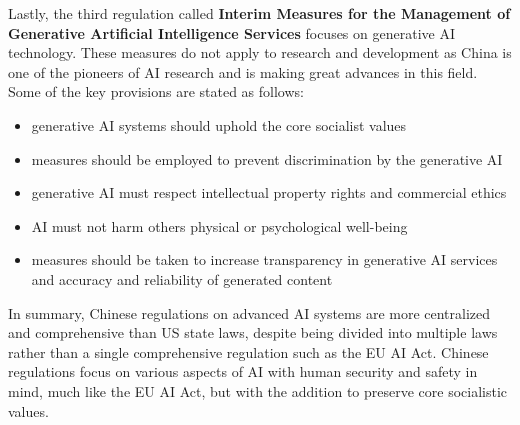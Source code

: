 Lastly, the third regulation called \textbf{Interim Measures for the Management of Generative Artificial Intelligence Services}\cite{InterimMeasuresGenerativeAI2023}\cite{CACGenerativeAIInterim2023} focuses on generative AI technology. These measures do not apply to research and development as China is one of the pioneers of AI research and is making great advances in this field. Some of the key provisions are stated as follows:
\begin{itemize}
    \item generative AI systems should uphold the core socialist values
    \item measures should be employed to prevent discrimination by the generative AI
    \item generative AI must respect intellectual property rights and commercial ethics
    \item AI must not harm others physical or psychological well-being
    \item measures should be taken to increase transparency in generative AI services and accuracy and reliability of generated content
\end{itemize}

In summary, Chinese regulations on advanced AI systems are more centralized and comprehensive than US state laws, despite being divided into multiple laws rather than a single comprehensive regulation such as the EU AI Act. Chinese regulations focus on various aspects of AI with human security and safety in mind, much like the EU AI Act, but with the addition to preserve core socialistic values.
